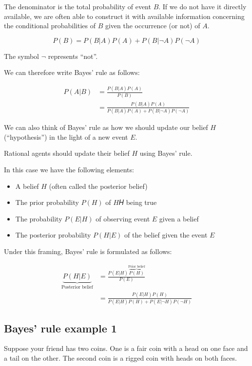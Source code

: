 \documentclass[
  letterpaper,
  DIV=11,
  numbers=noendperiod]{scrreprt}
\begin{document}
The denominator is the total probability of event \(B\). If we do not
have it directly available, we are often able to construct it with
available information concerning the conditional probabilities of \(B\)
given the occurrence (or not) of \(A\).

\[
P(B)=P(B|A)P(A)+P(B|\neg A)P(\neg A)
\]

The symbol \(\neg\) represents ``not''.

We can therefore write Bayes' rule as follows:

\begin{align*}
P(A|B)&=\frac{P(B|A)P(A)}{P(B)} \\[12pt]
&=\frac{P(B|A)P(A)}{P(B|A)P(A)+P(B|\neg A)P(\neg A)}
\end{align*}

We can also think of Bayes' rule as how we should update our belief
\(H\) (``hypothesis'') in the light of a new event \(E\).

Rational agents should update their belief \(H\) using Bayes' rule.

In this case we have the following elements:

\begin{itemize}
\item
  A belief \(H\) (often called the posterior belief)
\item
  The prior probability \(P(H)\) of \(H\)𝐻 being true
\item
  The probability \(P(E|H)\) of observing event \(E\) given a belief
\item
  The posterior probability \(P(H|E)\) of the belief given the event
  \(E\)
\end{itemize}

Under this framing, Bayes' rule is formulated as follows:

\begin{align*}
\underbrace{P(H|E)}_\text{Posterior belief}&=\frac{P(E|H)\overbrace{P(H)}^\text{Prior belief}}{P(E)} \\[12pt]
&=\frac{P(E|H)P(H)}{P(E|H)P(H)+P(E|\neg H)P(\neg H)}
\end{align*}

\hypertarget{bayes-rule-example-1}{%
\subsection{Bayes' rule example 1}\label{bayes-rule-example-1}}

Suppose your friend has two coins. One is a fair coin with a head on one
face and a tail on the other. The second coin is a rigged coin with
heads on both faces.
\end{document}

